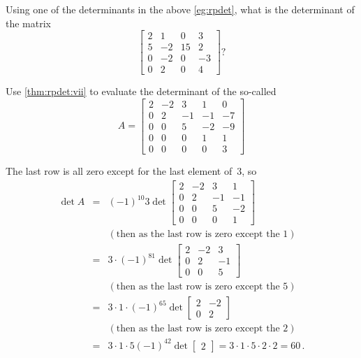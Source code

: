 



\begin{activity}
Using one of the determinants in the above \cref{eg:rpdet}, what is the determinant of the matrix
\begin{equation*}
\begin{bmatrix} 2&1&0&3
\\5&-2&15&2
\\0&-2&0&-3
\\0&2&0&4 \end{bmatrix} ?
\end{equation*}
\end{activity}






\begin{example} \label{eg:dettrii}
Use \cref{thm:rpdet:vii} to evaluate the determinant of the  so-called   
\begin{equation*}
A=\begin{bmatrix}2&-2&3&1&0
\\0&2&-1&-1&-7
\\0&0&5&-2&-9
\\0&0&0&1&1
\\0&0&0&0&3 \end{bmatrix}
\end{equation*}
\begin{solution} 
The last row is all zero except for the last element of~\(3\), so
\begin{eqnarray*}
\det A&=&(-1)^{10}3\det\begin{bmatrix}2&-2&3&1
\\0&2&-1&-1
\\0&0&5&-2
\\0&0&0&1\end{bmatrix}
\\&&(\text{then as the last row is zero except the~\(1\)})
\\&=&3\cdot (-1)^81\det\begin{bmatrix}2&-2&3
\\0&2&-1
\\0&0&5\end{bmatrix}
\\&&(\text{then as the last row is zero except the~\(5\)})
\\&=&3\cdot1\cdot(-1)^65\det\begin{bmatrix}2&-2
\\0&2\end{bmatrix}
\\&&(\text{then as the last row is zero except the~\(2\)})
\\&=&3\cdot1\cdot5(-1)^42\det\begin{bmatrix}2\end{bmatrix}
=3\cdot1\cdot5\cdot2\cdot2=60\,.
\end{eqnarray*}
\end{solution}
\end{example}


